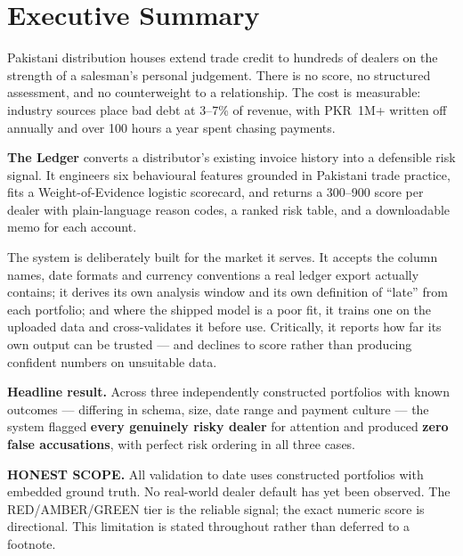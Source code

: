 \documentclass[11pt,a4paper]{article}
\newcommand{\lab}[1]{{\color{navy}\bfseries\footnotesize #1}}
\begin{document}
\section*{Executive Summary}
\vspace{-4pt}

Pakistani distribution houses extend trade credit to hundreds of dealers on the
strength of a salesman's personal judgement. There is no score, no structured
assessment, and no counterweight to a relationship. The cost is measurable:
industry sources place bad debt at 3--7\% of revenue, with PKR~1M+ written off
annually and over 100 hours a year spent chasing payments.

\textbf{The Ledger} converts a distributor's existing invoice history into a
defensible risk signal. It engineers six behavioural features grounded in
Pakistani trade practice, fits a Weight-of-Evidence logistic scorecard, and
returns a 300--900 score per dealer with plain-language reason codes, a ranked
risk table, and a downloadable memo for each account.

The system is deliberately built for the market it serves. It accepts the
column names, date formats and currency conventions a real ledger export
actually contains; it derives its own analysis window and its own definition of
``late'' from each portfolio; and where the shipped model is a poor fit, it
trains one on the uploaded data and cross-validates it before use. Critically,
it reports how far its own output can be trusted --- and declines to score
rather than producing confident numbers on unsuitable data.

\vspace{4pt}
\begin{keybox}
\textbf{Headline result.} Across three independently constructed portfolios with
known outcomes --- differing in schema, size, date range and payment culture ---
the system flagged \textbf{every genuinely risky dealer} for attention and
produced \textbf{zero false accusations}, with perfect risk ordering in all
three cases.
\end{keybox}

\begin{callout}
\lab{HONEST SCOPE.} All validation to date uses constructed portfolios with
embedded ground truth. No real-world dealer default has yet been observed. The
RED/AMBER/GREEN tier is the reliable signal; the exact numeric score is
directional. This limitation is stated throughout rather than deferred to a
footnote.
\end{callout}
\end{document}
